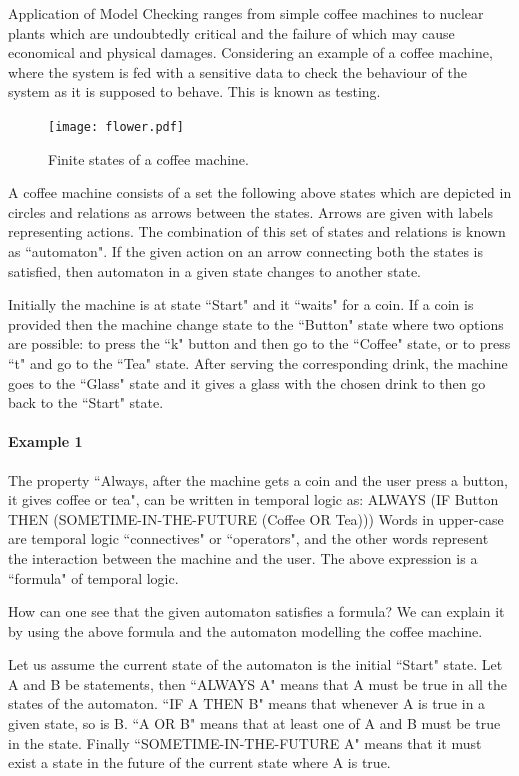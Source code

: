 \documentclass[a4paper,10pt]{report}
\begin{document}
Application of Model Checking ranges from simple coffee machines to nuclear plants which are undoubtedly critical and the failure of which may cause economical and physical damages. Considering an example of a coffee machine, where the system is fed with a sensitive data to check the behaviour of the system as it is supposed to behave. This is known as testing. 
\begin{figure}[h!]
\centering
 \texttt{[image: flower.pdf]}
\caption{Finite states of a coffee machine.}
\end{figure}
 A coffee machine consists of a set the following above states which are depicted in circles and relations as arrows between the states. Arrows are given with labels representing actions. The combination of this set of states and relations is known as ``automaton". If the given action on an arrow connecting both the states is satisfied, then automaton in a given state changes to another state. 
 
Initially the machine is at state ``Start" and it ``waits" for a coin. If a coin is provided then the machine change state to the ``Button" state where two options are possible: to press the ``k" button and then go to the ``Coffee" state, or to press ``t" and go to the ``Tea" state. After serving the corresponding drink, the machine goes to the ``Glass" state and it gives a glass with the chosen drink to then go back to the ``Start" state.
\paragraph{Example 1}
The property ``Always, after the machine gets a coin and the user press a button, it gives coffee or tea", can be written in temporal logic as:
ALWAYS (IF Button THEN (SOMETIME-IN-THE-FUTURE (Coffee OR Tea)))
Words in upper-case are temporal logic ``connectives" or ``operators", and the other words represent the interaction between the machine and the user. The above expression is a ``formula" of temporal logic.

How can one see that the given automaton satisfies a formula? We can explain it by using the above formula and the automaton modelling the coffee machine.

Let us assume the current state of the automaton is the initial ``Start" state. Let A and B be statements, then ``ALWAYS A" means that A must be true in all the states of the automaton. ``IF A THEN B" means that whenever A is true in a given state, so is B. ``A OR B" means that at least one of A and B must be true in the state. Finally ``SOMETIME-IN-THE-FUTURE A" means that it must exist a state in the future of the current state where A is true.
\end{document}
